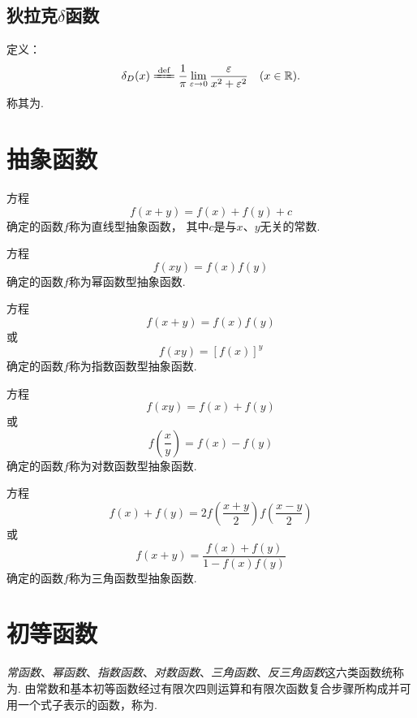 \subsection{狄拉克\texorpdfstring{\(\delta\)}{\textdelta}函数}
\begin{definition}
定义：\[
	\delta_D(x)
	\defeq \frac{1}{\pi}
		\lim\limits_{\varepsilon\to0}
		\frac{\varepsilon}{x^2+\varepsilon^2}
	\quad(x\in\mathbb{R}).
\]
称其为.
\end{definition}

\section{抽象函数}
方程\[
f(x+y) = f(x) + f(y) + c
\]确定的函数\(f\)称为直线型抽象函数，
其中\(c\)是与\(x\)、\(y\)无关的常数.

方程\[
f(xy) = f(x) f(y)
\]确定的函数\(f\)称为幂函数型抽象函数.

方程\[
f(x+y) = f(x) f(y)
\]或\[
f(xy) = [f(x)]^y
\]确定的函数\(f\)称为指数函数型抽象函数.

方程\[
f(xy) = f(x) + f(y)
\]或\[
f\left(\frac{x}{y}\right) = f(x) - f(y)
\]确定的函数\(f\)称为对数函数型抽象函数.

方程\[
f(x) + f(y) = 2 f\left(\frac{x+y}{2}\right) f\left(\frac{x-y}{2}\right)
\]或\[
f(x+y) = \frac{f(x) + f(y)}{1 - f(x) f(y)}
\]确定的函数\(f\)称为三角函数型抽象函数.

\section{初等函数}
\begin{definition}
\emph{常函数}、\emph{幂函数}、\emph{指数函数}、\emph{对数函数}、\emph{三角函数}、\emph{反三角函数}这六类函数统称为.
由常数和基本初等函数经过有限次四则运算和有限次函数复合步骤所构成并可用一个式子表示的函数，称为.
\end{definition}
